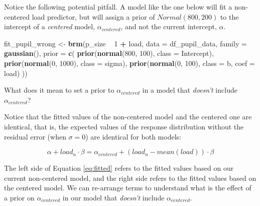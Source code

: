 \documentclass[12pt,]{krantz}
\newenvironment{Shaded}{\begin{snugshade}}{\end{snugshade}}
\newcommand{\KeywordTok}[1]{\textcolor[rgb]{0.13,0.29,0.53}{\textbf{#1}}}
\newcommand{\DataTypeTok}[1]{\textcolor[rgb]{0.13,0.29,0.53}{#1}}
\newcommand{\DecValTok}[1]{\textcolor[rgb]{0.00,0.00,0.81}{#1}}
\newcommand{\StringTok}[1]{\textcolor[rgb]{0.31,0.60,0.02}{#1}}
\newcommand{\OperatorTok}[1]{\textcolor[rgb]{0.81,0.36,0.00}{\textbf{#1}}}
\newcommand{\NormalTok}[1]{#1}
\theoremstyle{definition}
\theoremstyle{definition}
\theoremstyle{definition}
\theoremstyle{remark}
\begin{document}
Notice the following potential pitfall. A model like the one below will
fit a non-centered load predictor, but will assign a prior of
\(Normal(800,200)\) to the intercept of a \emph{centered} model,
\(\alpha_{centered}\), and not the current intercept, \(\alpha\).

\begin{Shaded}
\begin{Highlighting}[]
\NormalTok{fit_pupil_wrong <-}\StringTok{ }\KeywordTok{brm}\NormalTok{(p_size }\OperatorTok{~}\StringTok{ }\DecValTok{1} \OperatorTok{+}\StringTok{ }\NormalTok{load,}
                 \DataTypeTok{data =}\NormalTok{ df_pupil_data,}
                 \DataTypeTok{family =} \KeywordTok{gaussian}\NormalTok{(),}
                 \DataTypeTok{prior =} \KeywordTok{c}\NormalTok{(}
                     \KeywordTok{prior}\NormalTok{(}\KeywordTok{normal}\NormalTok{(}\DecValTok{800}\NormalTok{, }\DecValTok{100}\NormalTok{), }\DataTypeTok{class =}\NormalTok{ Intercept),}
                     \KeywordTok{prior}\NormalTok{(}\KeywordTok{normal}\NormalTok{(}\DecValTok{0}\NormalTok{, }\DecValTok{1000}\NormalTok{), }\DataTypeTok{class =}\NormalTok{ sigma),}
                     \KeywordTok{prior}\NormalTok{(}\KeywordTok{normal}\NormalTok{(}\DecValTok{0}\NormalTok{, }\DecValTok{100}\NormalTok{), }\DataTypeTok{class =}\NormalTok{ b, }\DataTypeTok{coef =}\NormalTok{ load)}
\NormalTok{                 ))}
\end{Highlighting}
\end{Shaded}

What does it mean to set a prior to \(\alpha_{centered}\) in a model
that \emph{doesn't} include \(\alpha_{centered}\)?

Notice that the fitted values of the non-centered model and the centered
one are identical, that is, the expected values of the response
distribution without the residual error (when \(\sigma =0\)) are
identical for both models:

\begin{equation}
\alpha + load_n \cdot \beta = \alpha_{centered} + (load_n - mean(load)) \cdot \beta 
\label{eq:fitted}
\end{equation}

The left side of Equation \eqref{eq:fitted} refers to the fitted values
based on our current non-centered model, and the right side refers to
the fitted values based on the centered model. We can re-arrange terms
to understand what is the effect of a prior on \(\alpha_{centered}\) in
our model that \emph{doesn't} include \(\alpha_{centered}\).
\end{document}
